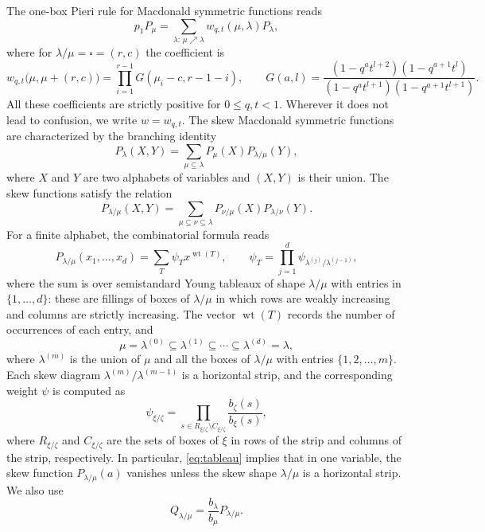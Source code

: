 \documentclass[11pt,reqno]{amsart}
\theoremstyle{definition}
\theoremstyle{remark}
\numberwithin{equation}{section}
\newcommand{\wt}{\operatorname{wt}}
\begin{document}
The one-box Pieri rule for Macdonald symmetric functions reads
\begin{equation}\label{eq:pieri}
 p_1P_\mu=\sum_{\lambda:\,\mu\nearrow\lambda}
 w_{q,t}(\mu,\lambda)P_\lambda,
\end{equation}
where for  $\lambda/\mu=\square=(r,c)$ the coefficient is
\begin{equation}\label{eq:edge-formula}
 w_{q,t}\bigl(\mu,\mu+(r,c)\bigr)
 =\prod_{i=1}^{r-1}G(\mu_i-c,r-1-i),\qquad 
 G(a,l)=\frac{(1-q^at^{l+2})(1-q^{a+1}t^l)}
                  {(1-q^at^{l+1})(1-q^{a+1}t^{l+1})}.
\end{equation}
All these coefficients are strictly positive for $0\le q,t<1$. Wherever it does not lead to confusion, we write $w=w_{q,t}$. The skew Macdonald symmetric functions are characterized by the branching identity
\begin{equation}\label{eq:branching}
 P_\lambda(X,Y)=\sum_{\mu\subseteq\lambda}
 P_\mu(X)P_{\lambda/\mu}(Y),
\end{equation}
where $X$ and $Y$ are two alphabets of variables and $(X,Y)$ is their union.
The skew functions satisfy the relation
\begin{equation}\label{eq:transitivity}
 P_{\lambda/\mu}(X,Y)=
 \sum_{\mu\subseteq\nu\subseteq\lambda}
 P_{\nu/\mu}(X)P_{\lambda/\nu}(Y).
\end{equation}
For a finite alphabet, the combinatorial formula reads
\begin{equation}\label{eq:tableau}
 P_{\lambda/\mu}(x_1,\ldots,x_d)
 =\sum_T\psi_T x^{\wt(T)},
 \qquad
 \psi_T=\prod_{j=1}^d\psi_{\lambda^{(j)}/\lambda^{(j-1)}},
\end{equation}
where the sum is over semistandard Young tableaux of shape $\lambda/\mu$ with entries
in $\{1,\ldots,d\}$: these are fillings of boxes of $\lambda/\mu$ in which rows are weakly increasing and columns are strictly
increasing. The vector $\wt(T)$ records the number of occurrences of each
entry, and
\[
 \mu=\lambda^{(0)}\subseteq\lambda^{(1)}\subseteq\cdots
 \subseteq\lambda^{(d)}=\lambda,
\]
where $\lambda^{(m)}$ is the union of $\mu$ and all the boxes of $\lambda/\mu$ with entries $\{1,2,\dots,m\}$. 
Each skew diagram $\lambda^{(m)}/\lambda^{(m-1)}$ is a
horizontal strip, and the corresponding weight $\psi$ is computed as 
\begin{equation}\label{eq:strip-weight}
 \psi_{\xi/\zeta}
 =\prod_{s\in R_{\xi/\zeta}\setminus C_{\xi/\zeta}}
       \frac{b_\zeta(s)}{b_\xi(s)},
\end{equation}
where $R_{\xi/\zeta}$ and $C_{\xi/\zeta}$ are the sets of boxes of $\xi$
in rows of the strip and columns of the strip, respectively. In particular, \eqref{eq:tableau} implies that in  one variable, the skew function $P_{\lambda/\mu}(a)$ vanishes unless the skew
shape $\lambda/\mu$ is a horizontal strip. We also use
\begin{equation}\label{eq:skew-Q}
 Q_{\lambda/\mu}=\frac{b_\lambda}{b_\mu}P_{\lambda/\mu}.
\end{equation}
\end{document}
